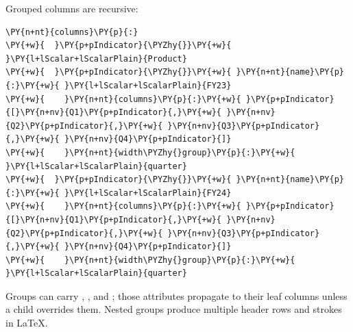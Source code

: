 \documentclass[a4paper,twoside]{article}
\begin{document}
Grouped columns are recursive:
\begin{tscode}[lang=yaml, engine=pygments]
\begin{Verbatim}[commandchars=\\\{\},breaklines, breakanywhere, commandchars=\\\{\}]
\PY{n+nt}{columns}\PY{p}{:}
\PY{+w}{  }\PY{p+pIndicator}{\PYZhy{}}\PY{+w}{ }\PY{l+lScalar+lScalarPlain}{Product}
\PY{+w}{  }\PY{p+pIndicator}{\PYZhy{}}\PY{+w}{ }\PY{n+nt}{name}\PY{p}{:}\PY{+w}{ }\PY{l+lScalar+lScalarPlain}{FY23}
\PY{+w}{    }\PY{n+nt}{columns}\PY{p}{:}\PY{+w}{ }\PY{p+pIndicator}{[}\PY{n+nv}{Q1}\PY{p+pIndicator}{,}\PY{+w}{ }\PY{n+nv}{Q2}\PY{p+pIndicator}{,}\PY{+w}{ }\PY{n+nv}{Q3}\PY{p+pIndicator}{,}\PY{+w}{ }\PY{n+nv}{Q4}\PY{p+pIndicator}{]}
\PY{+w}{    }\PY{n+nt}{width\PYZhy{}group}\PY{p}{:}\PY{+w}{ }\PY{l+lScalar+lScalarPlain}{quarter}
\PY{+w}{  }\PY{p+pIndicator}{\PYZhy{}}\PY{+w}{ }\PY{n+nt}{name}\PY{p}{:}\PY{+w}{ }\PY{l+lScalar+lScalarPlain}{FY24}
\PY{+w}{    }\PY{n+nt}{columns}\PY{p}{:}\PY{+w}{ }\PY{p+pIndicator}{[}\PY{n+nv}{Q1}\PY{p+pIndicator}{,}\PY{+w}{ }\PY{n+nv}{Q2}\PY{p+pIndicator}{,}\PY{+w}{ }\PY{n+nv}{Q3}\PY{p+pIndicator}{,}\PY{+w}{ }\PY{n+nv}{Q4}\PY{p+pIndicator}{]}
\PY{+w}{    }\PY{n+nt}{width\PYZhy{}group}\PY{p}{:}\PY{+w}{ }\PY{l+lScalar+lScalarPlain}{quarter}
\end{Verbatim}
\end{tscode}
Groups can carry , , and ; those attributes
propagate to their leaf columns unless a child overrides them. Nested groups
produce multiple header rows and  strokes in \LaTeX{}.
\end{document}
